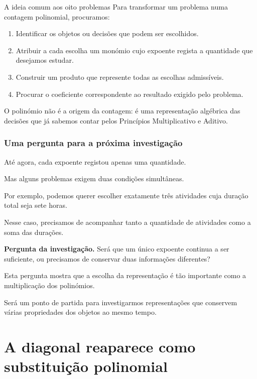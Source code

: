 \documentclass[11pt,a4paper,oneside]{book}
\newcommand{\Pergunta}[1]{\begin{perguntabox}\textbf{Pergunta da investigação.} #1\end{perguntabox}}
\begin{document}
\begin{descobertabox}{A ideia comum aos oito problemas}
Para transformar um problema
numa contagem polinomial, procuramos:

\begin{enumerate}
\item Identificar os objetos ou decisões
que podem ser escolhidos.

\item Atribuir a cada escolha um monómio
cujo expoente regista a quantidade
que desejamos estudar.

\item Construir um produto que represente
todas as escolhas admissíveis.

\item Procurar o coeficiente correspondente
ao resultado exigido pelo problema.
\end{enumerate}

O polinómio não é a origem da contagem:
é uma representação algébrica
das decisões que já sabemos contar
pelos Princípios Multiplicativo e Aditivo.
\end{descobertabox}

\subsection*{Uma pergunta para a próxima investigação}

Até agora, cada expoente registou
apenas uma quantidade.

Mas alguns problemas exigem
duas condições simultâneas.

Por exemplo, podemos querer escolher
exatamente três atividades
cuja duração total seja sete horas.

Nesse caso, precisamos de acompanhar
tanto a quantidade de atividades
como a soma das durações.

\Pergunta{Será que um único expoente
continua a ser suficiente,
ou precisamos de conservar
duas informações diferentes?}

Esta pergunta mostra que
a escolha da representação
é tão importante como
a multiplicação dos polinómios.

Será um ponto de partida
para investigarmos representações
que conservem várias propriedades
dos objetos ao mesmo tempo.


\chapter{A diagonal reaparece como substituição polinomial}
\end{document}
